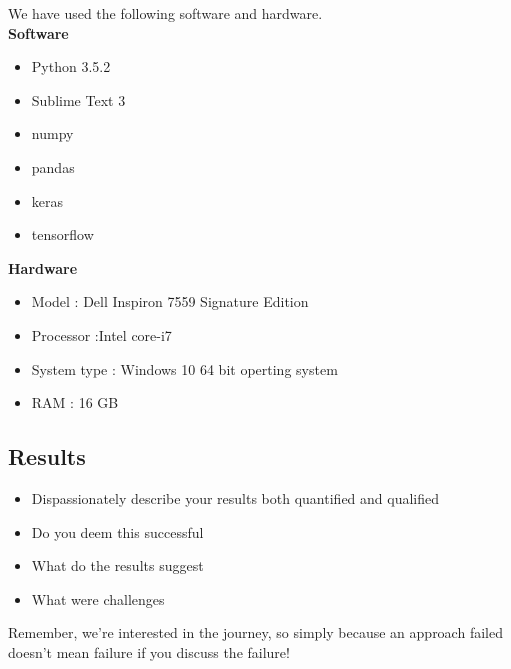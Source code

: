 \documentclass[fleqn,10pt]{SelfArx} %
\begin{document}
We have used the following software and hardware.\\
\textbf{Software}
\begin{itemize}[noitemsep]
	\item Python 3.5.2
	\item Sublime Text 3
	\item numpy
	\item pandas
	\item keras
	\item tensorflow
\end{itemize}
\textbf{Hardware}
\begin{itemize}[noitemsep]
	\item Model : Dell Inspiron 7559 Signature Edition
	\item Processor :Intel core-i7
	\item System type : Windows 10 64 bit operting system
	\item RAM : 16 GB
\end{itemize}


\subsection{Results}
\begin{itemize}[noitemsep]
\item Dispassionately describe your results both quantified and qualified
\item Do you deem this successful
\item What do the results suggest
\item What were challenges
\end{itemize}
Remember, we're interested in the journey, so simply because an approach failed doesn't mean failure if you discuss the failure!
\end{document}

